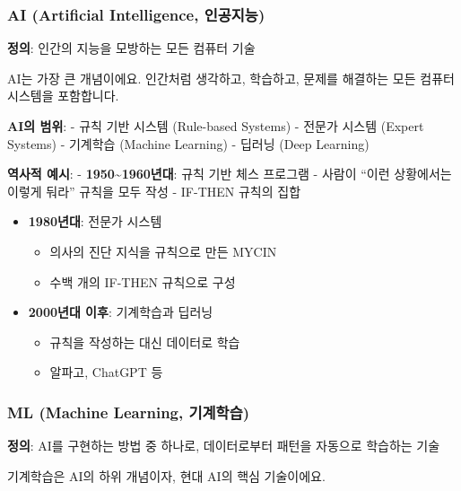 \documentclass[a4paper, 11pt]{article}
\providecommand{\tightlist}{%
  \setlength{\itemsep}{0pt}\setlength{\parskip}{0pt}}
\begin{document}
\hypertarget{ai-artificial-intelligence-uxc778uxacf5uxc9c0uxb2a5}{%
\subsubsection{ AI (Artificial Intelligence,
인공지능)}\label{ai-artificial-intelligence-uxc778uxacf5uxc9c0uxb2a5}}

\textbf{정의}: 인간의 지능을 모방하는 모든 컴퓨터 기술

AI는 가장 큰 개념이에요. 인간처럼 생각하고, 학습하고, 문제를 해결하는
모든 컴퓨터 시스템을 포함합니다.

\textbf{AI의 범위}: - 규칙 기반 시스템 (Rule-based Systems) - 전문가
시스템 (Expert Systems) - 기계학습 (Machine Learning) - 딥러닝 (Deep
Learning)

\textbf{역사적 예시}: - \textbf{1950\textasciitilde1960년대}: 규칙 기반
체스 프로그램 - 사람이 ``이런 상황에서는 이렇게 둬라'' 규칙을 모두 작성
- IF-THEN 규칙의 집합

\begin{itemize}
\tightlist
\item
  \textbf{1980년대}: 전문가 시스템

  \begin{itemize}
  \tightlist
  \item
    의사의 진단 지식을 규칙으로 만든 MYCIN
  \item
    수백 개의 IF-THEN 규칙으로 구성
  \end{itemize}
\item
  \textbf{2000년대 이후}: 기계학습과 딥러닝

  \begin{itemize}
  \tightlist
  \item
    규칙을 작성하는 대신 데이터로 학습
  \item
    알파고, ChatGPT 등
  \end{itemize}
\end{itemize}

\hypertarget{ml-machine-learning-uxae30uxacc4uxd559uxc2b5}{%
\subsubsection{ ML (Machine Learning,
기계학습)}\label{ml-machine-learning-uxae30uxacc4uxd559uxc2b5}}

\textbf{정의}: AI를 구현하는 방법 중 하나로, 데이터로부터 패턴을
자동으로 학습하는 기술

기계학습은 AI의 하위 개념이자, 현대 AI의 핵심 기술이에요.
\end{document}
